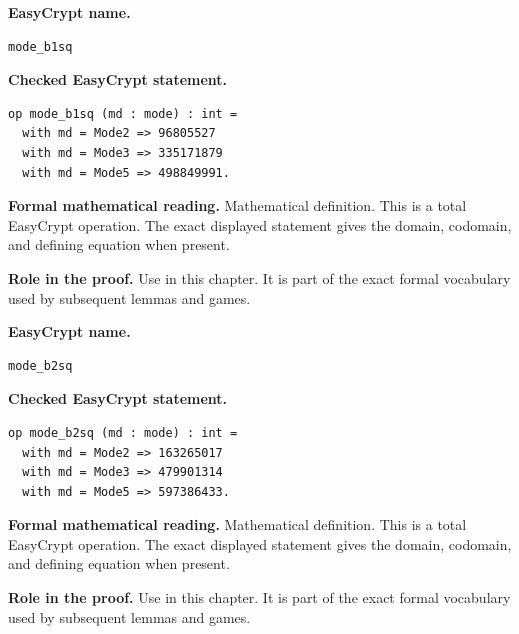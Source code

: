 \begin{formaldefinition}
\noindent\textbf{EasyCrypt name.}
\begin{lstlisting}[language=EasyCrypt,basicstyle=\ttfamily\scriptsize]
mode_b1sq
\end{lstlisting}
\noindent\textbf{Checked EasyCrypt statement.}
\begin{lstlisting}[language=EasyCrypt,basicstyle=\ttfamily\scriptsize]
op mode_b1sq (md : mode) : int =
  with md = Mode2 => 96805527
  with md = Mode3 => 335171879
  with md = Mode5 => 498849991.
\end{lstlisting}
\noindent\textbf{Formal mathematical reading.}
Mathematical definition. This is a total EasyCrypt operation.  The exact displayed statement gives the domain, codomain, and defining equation when present.

\noindent\textbf{Role in the proof.}
Use in this chapter. It is part of the exact formal vocabulary used by subsequent lemmas and games.

\end{formaldefinition}

\begin{formaldefinition}
\noindent\textbf{EasyCrypt name.}
\begin{lstlisting}[language=EasyCrypt,basicstyle=\ttfamily\scriptsize]
mode_b2sq
\end{lstlisting}
\noindent\textbf{Checked EasyCrypt statement.}
\begin{lstlisting}[language=EasyCrypt,basicstyle=\ttfamily\scriptsize]
op mode_b2sq (md : mode) : int =
  with md = Mode2 => 163265017
  with md = Mode3 => 479901314
  with md = Mode5 => 597386433.
\end{lstlisting}
\noindent\textbf{Formal mathematical reading.}
Mathematical definition. This is a total EasyCrypt operation.  The exact displayed statement gives the domain, codomain, and defining equation when present.

\noindent\textbf{Role in the proof.}
Use in this chapter. It is part of the exact formal vocabulary used by subsequent lemmas and games.

\end{formaldefinition}

